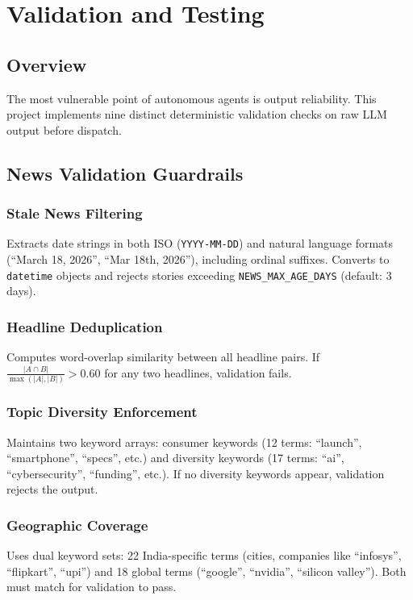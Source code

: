 \documentclass[12pt,a4paper]{report}
\begin{document}
\chapter{Validation and Testing}

\section{Overview}
The most vulnerable point of autonomous agents is output reliability. This project implements nine distinct deterministic validation checks on raw LLM output before dispatch.

\section{News Validation Guardrails}

\subsection{Stale News Filtering}
Extracts date strings in both ISO (\texttt{YYYY-MM-DD}) and natural language formats (``March 18, 2026'', ``Mar 18th, 2026''), including ordinal suffixes. Converts to \texttt{datetime} objects and rejects stories exceeding \texttt{NEWS\_MAX\_AGE\_DAYS} (default: 3 days).

\subsection{Headline Deduplication}
Computes word-overlap similarity between all headline pairs. If $\frac{|A \cap B|}{\max(|A|, |B|)} > 0.60$ for any two headlines, validation fails.

\subsection{Topic Diversity Enforcement}
Maintains two keyword arrays: consumer keywords (12 terms: ``launch'', ``smartphone'', ``specs'', etc.) and diversity keywords (17 terms: ``ai'', ``cybersecurity'', ``funding'', etc.). If no diversity keywords appear, validation rejects the output.

\subsection{Geographic Coverage}
Uses dual keyword sets: 22 India-specific terms (cities, companies like ``infosys'', ``flipkart'', ``upi'') and 18 global terms (``google'', ``nvidia'', ``silicon valley''). Both must match for validation to pass.
\end{document}
